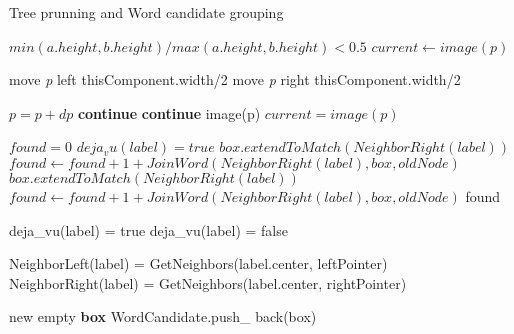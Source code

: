 \begin{algorithm}
\caption{Tree prunning and Word candidate grouping}\label{alg:WordCandidate}
\begin{algorithmic}[1]
\State \Return $min(a.height,b.height)/max(a.height,b.height)<0.5$
\EndProcedure
{}
\State $current \gets image(p)$

	\State move \textit{p} left thisComponent.width/2
\Else
	\State move \textit{p} right thisComponent.width/2
\EndIf

\State $p=p+dp$
 \textbf{continue} \EndIf
{} \textbf{continue} \EndIf
{}
	\State \Return image(p)
\Else
	\State $current = image(p)$
\EndIf
\EndFor
\State {}
\EndProcedure
\item[]
\item[]
	\State $found = 0$
	\State $deja_vu(label)= true$	
		\State $box.extendToMatch(NeighborRight(label))$
		\State $found \gets found + 1 + JoinWord(NeighborRight(label),box,oldNode)$
	\EndIf
		\State $box.extendToMatch(NeighborRight(label))$
		\State $found \gets found + 1 + JoinWord(NeighborRight(label),box,oldNode)$	
	\EndIf
	\State \Return found
\EndFunction
\item[]
\item[]
		\State	deja\_vu(label) = true
	\Else
		\State	deja\_vu(label) = false
	\EndIf
\EndFor

	\State NeighborLeft(label) = GetNeighbors(label.center, leftPointer)
	\State NeighborRight(label) = GetNeighbors(label.center, rightPointer)
\EndFor

	\State new empty \textbf{box}
		WordCandidate.push\_ back(box)
	\EndIf
\EndFor

\EndProcedure
\end{algorithmic}

\end{algorithm}
